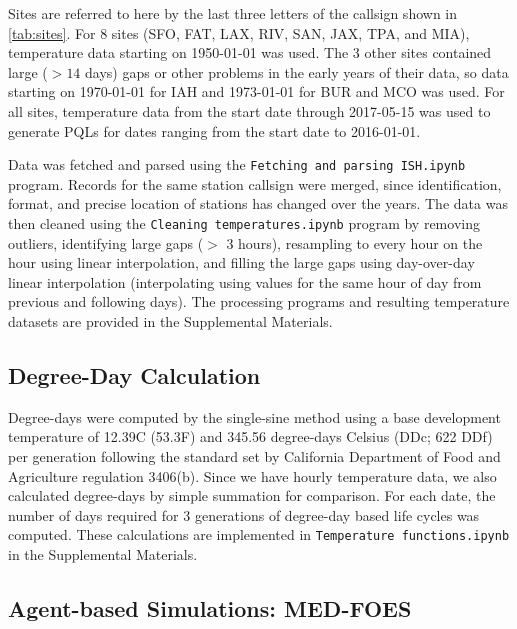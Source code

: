 \documentclass[10pt,a4paper,twocolumn]{article}
\begin{document}
Sites are referred to here by the last three letters of the callsign shown in 
\autoref{tab:sites}.
For 8 sites (SFO, FAT, LAX, RIV, SAN, JAX, TPA, and MIA), temperature data starting on 1950-01-01 was used.
The 3 other sites contained large (${>}14$ days) gaps or other problems in the early years of their data,
so data starting on 1970-01-01 for IAH and 1973-01-01 for BUR and MCO was used.
For all sites, temperature data from the start date through 2017-05-15 was used
to generate PQLs for dates ranging from the start date to 2016-01-01.

Data was fetched and parsed using the \texttt{Fetching and parsing ISH.ipynb} program.
Records for the same station callsign were merged, since identification, format, 
and precise location of stations has changed over the years.
The data was then cleaned using the 
\texttt{Cleaning temperatures.ipynb} program by 
removing outliers, 
identifying large gaps ($>$ 3 hours), 
resampling to every hour on the hour using linear interpolation,
and filling the large gaps using day-over-day linear interpolation
(interpolating using values for the same hour of day from previous and following days).
The processing programs and resulting temperature datasets are 
provided in the Supplemental Materials.


\subsection*{Degree-Day Calculation}
Degree-days were computed by the single-sine method\cite{ECY:ECY1969503514}
using a base development temperature of 12.39\degree C (53.3\degree F) 
and 345.56 degree-days Celsius (DDc; 622 DDf) per generation 
following the standard set by California Department of Food and Agriculture
regulation 3406(b)\cite{CDFA_Medfly,3-CA-ADC-3406}.
Since we have hourly temperature data, we also calculated degree-days by simple summation
for comparison\cite{Roltsch1999}.
For each date, the number of days required for 3 generations of degree-day 
based life cycles was computed.
These calculations are implemented in \texttt{Temperature functions.ipynb} in the Supplemental Materials.


\subsection*{Agent-based Simulations: MED-FOES}
\end{document}
